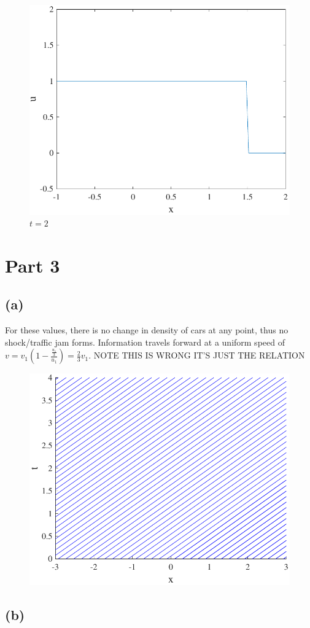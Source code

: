 \documentclass{article}
\begin{document}
\begin{figure}[!htbp]
  \centering
    \includegraphics[width=.49\textwidth]{hw_14_plot13.pdf}
    \caption{$t = 2$}
\end{figure}
\section*{Part 3}
\subsection*{(a)}
For these values, there is no change in density of cars at any point, thus no shock/traffic jam forms. Information travels forward at a uniform speed of $v = v_1(1 - \frac{\frac{u_1}{3}}{u_1}) = \frac{2}{3}v_1$. NOTE THIS IS WRONG IT'S JUST THE RELATION
\begin{figure}[!htbp]
  \centering
    \includegraphics[width=.49\textwidth]{hw_14_plot14.pdf}
    \caption{}
\end{figure}
\subsection*{(b)}
\end{document}
